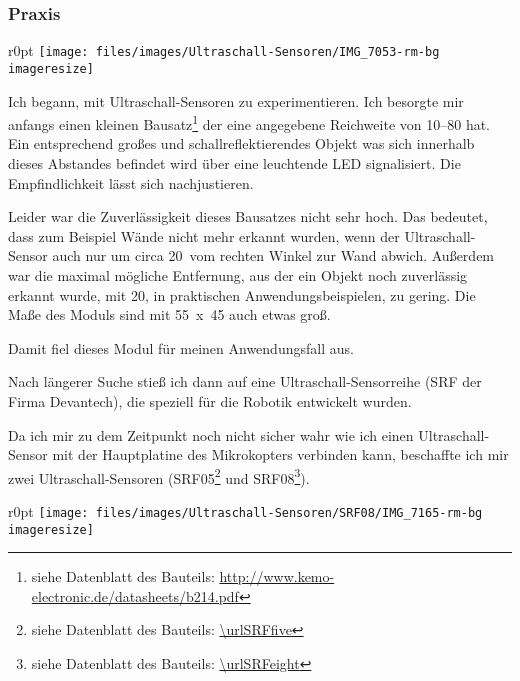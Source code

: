\subsubsection{Praxis}
\begin{wrapfigure}{r}{0pt}
	\texttt{[image: files/images/Ultraschall-Sensoren/IMG\_7053-rm-bg\\imageresize]}
\end{wrapfigure}
Ich begann, mit Ultraschall-Sensoren zu experimentieren.
Ich besorgte mir anfangs einen kleinen Bausatz\footnote{siehe Datenblatt des Bauteils:
\url{http://www.kemo-electronic.de/datasheets/b214.pdf}}
der eine angegebene Reichweite von 10--\unit{80}{\centi\metre} hat.
Ein entsprechend großes und schallreflektierendes Objekt was sich innerhalb
dieses Abstandes befindet wird über eine leuchtende \ac{LED}
signalisiert.
Die Empfindlichkeit lässt sich nachjustieren.

Leider war die Zuverlässigkeit dieses Bausatzes nicht sehr hoch.
Das bedeutet, dass zum Beispiel Wände nicht mehr erkannt wurden, wenn der Ultraschall-Sensor
auch nur um circa 20\textdegree\ vom rechten Winkel zur Wand abwich.
Außerdem war die maximal mögliche Entfernung,
aus der ein Objekt noch zuverlässig erkannt wurde,
mit \unit{20}{\centi\metre}, in praktischen Anwendungsbeispielen, zu gering.
Die Maße des Moduls sind mit \unit{55 x 45}{\milli\metre} auch etwas groß.

Damit fiel dieses Modul für meinen Anwendungsfall aus.

\bigskip
Nach längerer Suche stieß ich dann auf eine Ultraschall-Sensorreihe
(SRF der Firma Devantech),
die speziell für die Robotik entwickelt wurden.

Da ich mir zu dem Zeitpunkt noch nicht sicher wahr
wie ich einen Ultraschall-Sensor mit der Hauptplatine
des Mikrokopters verbinden kann,
beschaffte ich mir zwei Ultraschall-Sensoren
(SRF05\footnote{siehe Datenblatt des Bauteils:
\url{\urlSRFfive}} und
SRF08\footnote{siehe Datenblatt des Bauteils:
\url{\urlSRFeight}}).

\begin{wrapfigure}{r}{0pt}
	\texttt{[image: files/images/Ultraschall-Sensoren/SRF08/IMG\_7165-rm-bg\\imageresize]}
\end{wrapfigure}

